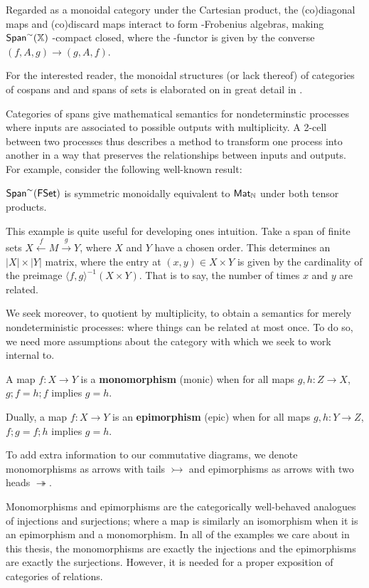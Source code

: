 Regarded as a monoidal category under the Cartesian product, the (co)diagonal maps and (co)discard maps interact to form \dag-Frobenius algebras, making  $\mathsf{Span}^\sim(\mathbb{X})$  \dag-compact closed, where the \dag-functor is given by the converse  $(f,A,g)\to (g,A,f)$.

For the interested reader, the monoidal structures (or lack thereof) of categories of cospans and and spans of sets is elaborated on in great detail in \cite{bruni}.

Categories of spans give mathematical semantics for nondeterminstic processes where inputs are associated to possible outputs with multiplicity. 
A 2-cell between two processes thus describes a method to transform one process into another in a way that preserves the relationships between inputs and outputs.  For example, consider the following well-known result:
\begin{example}
$\mathsf{Span}^\sim(\mathsf{FSet})$ is symmetric monoidally equivalent to $\mathsf{Mat}_{\mathbb{N}}$ under both tensor products.
\end{example}
This example is quite useful for developing ones intuition.  Take a span of finite sets $X\xleftarrow{f} M \xrightarrow{g} Y$, where $X$ and $Y$ have a chosen order. This determines an $|X|\times |Y|$ matrix, where the entry at $(x,y)\in X\times Y$ is given by the cardinality of the preimage $\langle f,g\rangle^{-1}(X\times Y)$.  That is to say, the number of times $x$ and $y$ are related.



We seek moreover, to quotient by multiplicity, to obtain a semantics for merely nondeterministic processes: where things can be related at most once.  To do so, we need more assumptions about the category with which we seek to work internal to.
\begin{definition}
A map $f:X\to Y$ is a {\bf monomorphism} (monic) when for all maps $g,h:Z\to X$, $g;f=h;f$ implies $ g=h$.

Dually, a map $f:X\to Y$ is an {\bf epimorphism} (epic) when for all maps $g,h:Y\to Z$, $f;g=f;h$ implies $ g=h$.

To add extra information to our commutative diagrams, we denote monomorphisms as arrows with tails $\rightarrowtail$ and epimorphisms as arrows with two heads $\twoheadrightarrow$.  
\end{definition}
Monomorphisms and epimorphisms are the categorically well-behaved analogues of injections and surjections; where a map is similarly an isomorphism when it is an epimorphism and a monomorphism.  In all of the examples we care about in this thesis, the monomorphisms are exactly the injections and the epimorphisms are exactly the surjections.  However, it is needed for a proper exposition of categories of relations.

